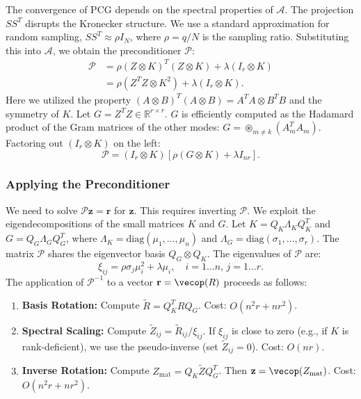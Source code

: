 \documentclass[11pt]{article}
\begin{document}
The convergence of PCG depends on the spectral properties of $\mathcal{A}$. The projection $S S^T$ disrupts the Kronecker structure. We use a standard approximation for random sampling, $S S^T \approx \rho I_N$, where $\rho = q/N$ is the sampling ratio.
Substituting this into $\mathcal{A}$, we obtain the preconditioner $\mathcal{P}$:
\begin{align}
    \mathcal{P} &= \rho (Z \otimes K)^T (Z \otimes K) + \lambda (I_r \otimes K) \nonumber \\
    &= \rho (Z^T Z \otimes K^2) + \lambda (I_r \otimes K).
\end{align}
Here we utilized the property $(A \otimes B)^T (A \otimes B) = A^T A \otimes B^T B$ and the symmetry of $K$. Let $G = Z^T Z \in \mathbb{R}^{r \times r}$. $G$ is efficiently computed as the Hadamard product of the Gram matrices of the other modes: $G = \mathop{\circledast}_{m \neq k} (A_m^T A_m)$.
Factoring out $(I_r \otimes K)$ on the left:
\begin{equation}
    \mathcal{P} = (I_r \otimes K) \left[ \rho (G \otimes K) + \lambda I_{nr} \right].
\end{equation}

\subsubsection{Applying the Preconditioner}
We need to solve $\mathcal{P} \mathbf{z} = \mathbf{r}$ for $\mathbf{z}$. This requires inverting $\mathcal{P}$. We exploit the eigendecompositions of the small matrices $K$ and $G$.
Let $K = Q_K \Lambda_K Q_K^T$ and $G = Q_G \Lambda_G Q_G^T$, where $\Lambda_K = \text{diag}(\mu_1, \dots, \mu_n)$ and $\Lambda_G = \text{diag}(\sigma_1, \dots, \sigma_r)$.
The matrix $\mathcal{P}$ shares the eigenvector basis $Q_G \otimes Q_K$. The eigenvalues of $\mathcal{P}$ are:
\begin{equation}
    \xi_{ij} = \rho \sigma_j \mu_i^2 + \lambda \mu_i, \quad i=1\dots n, \, j=1\dots r.
\end{equation}
The application of $\mathcal{P}^{-1}$ to a vector $\mathbf{r} = \vecop(R)$ proceeds as follows:
\begin{enumerate}
    \item \textbf{Basis Rotation:} Compute $\tilde{R} = Q_K^T R Q_G$. 
    Cost: $O(n^2 r + nr^2)$.
    \item \textbf{Spectral Scaling:} Compute $\tilde{Z}_{ij} = \tilde{R}_{ij} / \xi_{ij}$. If $\xi_{ij}$ is close to zero (e.g., if $K$ is rank-deficient), we use the pseudo-inverse (set $\tilde{Z}_{ij}=0$).
    Cost: $O(nr)$.
    \item \textbf{Inverse Rotation:} Compute $Z_{\text{mat}} = Q_K \tilde{Z} Q_G^T$. Then $\mathbf{z} = \vecop(Z_{\text{mat}})$.
    Cost: $O(n^2 r + nr^2)$.
\end{enumerate}
\end{document}
